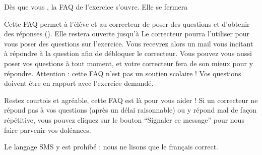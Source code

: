 ﻿Dès que vous , la FAQ de l’exercice s’ouvre. Elle se fermera %

Cette FAQ permet à l’élève et au correcteur de poser des questions et d’obtenir des réponses ().
Elle restera ouverte jusqu’à %
Le correcteur pourra l’utiliser pour vous poser des questions sur l’exercice. Vous recevrez alors un mail vous incitant à répondre à la question afin de débloquer le correcteur.
Vous pouvez vous aussi poser vos questions à tout moment, et votre correcteur fera de son mieux pour y répondre.
Attention : cette FAQ n’est pas un soutien scolaire ! Vos questions doivent être en rapport avec l’exercice demandé.

Restez courtois et agréable, cette FAQ est là pour vous aider !
Si un correcteur ne répond pas à vos questions (après un délai raisonnable) ou y répond mal de façon répétitive, vous pouvez cliquez sur le bouton “Signaler ce message” pour nous faire parvenir vos doléances.

Le langage SMS y est prohibé : nous ne lisons que le français correct.